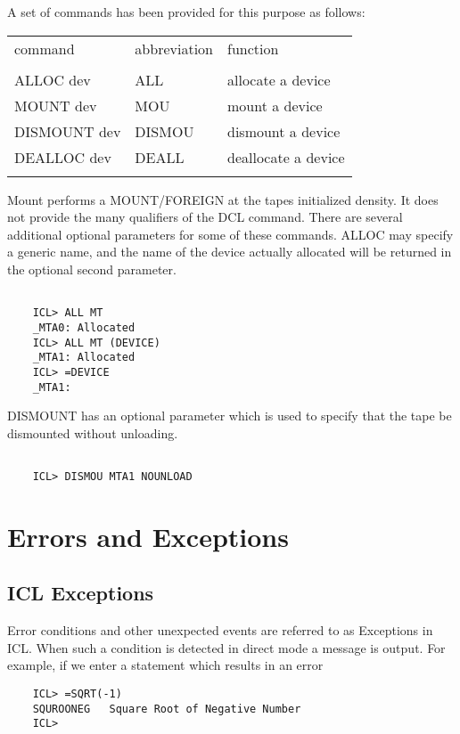 A set of commands has been provided for this purpose as follows:

\begin{center}
\begin{tabular}{lll}
\\
command & abbreviation & function\\
\\
ALLOC dev & ALL & allocate a device\\
MOUNT dev & MOU & mount a device\\
DISMOUNT dev & DISMOU & dismount a device\\
DEALLOC dev & DEALL & deallocate a device\\
\\
\end{tabular}
\end{center}
Mount performs a MOUNT/FOREIGN at the tapes initialized density. It does
not provide the many qualifiers of the DCL command. There are several
additional optional parameters for some of these commands. ALLOC may
specify a generic name, and the name of the device actually allocated
will be returned in the optional second parameter.
\begin{verbatim}

    ICL> ALL MT
    _MTA0: Allocated
    ICL> ALL MT (DEVICE)
    _MTA1: Allocated
    ICL> =DEVICE
    _MTA1:

\end{verbatim}
DISMOUNT has an optional parameter which is used to specify that the
tape be dismounted without unloading.
\begin{verbatim}

    ICL> DISMOU MTA1 NOUNLOAD

\end{verbatim}

\chapter{Errors and Exceptions}

\section{ICL Exceptions}

Error conditions and other unexpected events are referred to as Exceptions
in ICL. When such a condition is detected in direct mode a message is 
output. For example, if we enter a statement which results in an error
\begin{verbatim}
    ICL> =SQRT(-1)
    SQUROONEG   Square Root of Negative Number
    ICL>
\end{verbatim}

